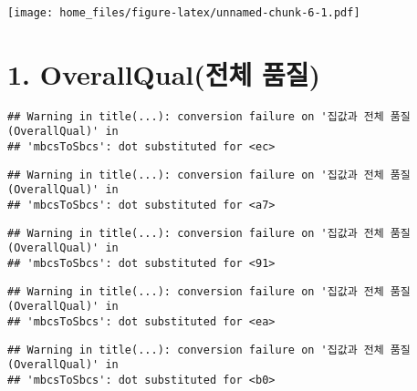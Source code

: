 \documentclass[
]{article}
\newenvironment{Shaded}{\begin{snugshade}}{\end{snugshade}}
\newcommand{\AttributeTok}[1]{\textcolor[rgb]{0.77,0.63,0.00}{#1}}
\newcommand{\DecValTok}[1]{\textcolor[rgb]{0.00,0.00,0.81}{#1}}
\newcommand{\FunctionTok}[1]{\textcolor[rgb]{0.00,0.00,0.00}{#1}}
\newcommand{\NormalTok}[1]{#1}
\newcommand{\SpecialCharTok}[1]{\textcolor[rgb]{0.00,0.00,0.00}{#1}}
\newcommand{\StringTok}[1]{\textcolor[rgb]{0.31,0.60,0.02}{#1}}
\begin{document}
\texttt{[image: home\_files/figure-latex/unnamed-chunk-6-1.pdf]}

\hypertarget{overallqualuxc804uxccb4-uxd488uxc9c8}{%
\section{1. OverallQual(전체
품질)}\label{overallqualuxc804uxccb4-uxd488uxc9c8}}

\begin{Shaded}
\end{Shaded}

\begin{verbatim}
## Warning in title(...): conversion failure on '집값과 전체 품질(OverallQual)' in
## 'mbcsToSbcs': dot substituted for <ec>
\end{verbatim}

\begin{verbatim}
## Warning in title(...): conversion failure on '집값과 전체 품질(OverallQual)' in
## 'mbcsToSbcs': dot substituted for <a7>
\end{verbatim}

\begin{verbatim}
## Warning in title(...): conversion failure on '집값과 전체 품질(OverallQual)' in
## 'mbcsToSbcs': dot substituted for <91>
\end{verbatim}

\begin{verbatim}
## Warning in title(...): conversion failure on '집값과 전체 품질(OverallQual)' in
## 'mbcsToSbcs': dot substituted for <ea>
\end{verbatim}

\begin{verbatim}
## Warning in title(...): conversion failure on '집값과 전체 품질(OverallQual)' in
## 'mbcsToSbcs': dot substituted for <b0>
\end{verbatim}
\end{document}
